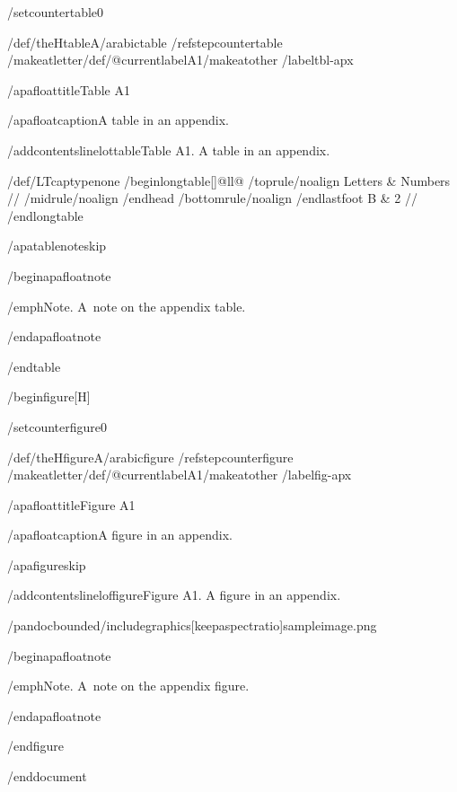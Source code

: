 /setcounter{table}{0}

/def/theHtable{A/arabic{table}}%
/refstepcounter{table}%
/makeatletter/def/@currentlabel{A1}/makeatother%
/label{tbl-apx}

/apafloattitle{Table A1}

/apafloatcaption{A table in an appendix.}

/addcontentsline{lot}{table}{Table A1. A table in an appendix.}

{/def/LTcaptype{none} %
/begin{longtable}[]{@{}ll@{}}
/toprule/noalign{}
Letters & Numbers //
/midrule/noalign{}
/endhead
/bottomrule/noalign{}
/endlastfoot
B & 2 //
/end{longtable}
}

/apatablenoteskip

/begin{apafloatnote}

/emph{Note}. A~note on the appendix table.

/end{apafloatnote}

/end{table}

/begin{figure}[H]

/setcounter{figure}{0}

/def/theHfigure{A/arabic{figure}}%
/refstepcounter{figure}%
/makeatletter/def/@currentlabel{A1}/makeatother%
/label{fig-apx}

/apafloattitle{Figure A1}

/apafloatcaption{A figure in an appendix.}

/apafigureskip

/addcontentsline{lof}{figure}{Figure A1. A figure in an appendix.}

/pandocbounded{/includegraphics[keepaspectratio]{sampleimage.png}}

/begin{apafloatnote}

/emph{Note}. A~note on the appendix figure.

/end{apafloatnote}

/end{figure}




/end{document}
